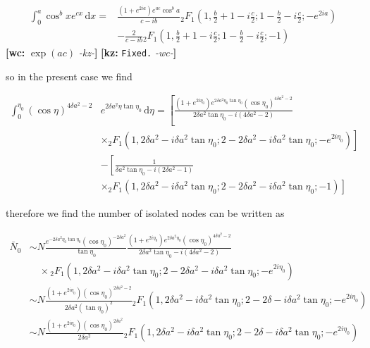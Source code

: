 \documentclass[preprint,notitlepage,amsmath,amssymb,floatfix]{revtex4-1}
\newcommand{\XXX}[3]{{\bf [#1: } {\tt #3} {\it -#2-}{\bf ]}}
\begin{document}
\begin{equation}
\begin{split}
\int_0^a\!\cos^bxe^{cx}\,\mathrm dx = &\frac{\left(1+e^{2ia}\right)e^{ac}\cos^ba}{c-ib} {}_2F_1\left(1,\frac{b}{2}+1-i\frac{c}{2};1-\frac{b}{2}-i\frac{c}{2};-e^{2ia}\right) \\
& - \frac{2}{c-ib} {}_2F_1\left(1,\frac{b}{2}+1-i\frac{c}{2};1-\frac{b}{2}-i\frac{c}{2};-1\right)
\end{split}
\end{equation}
\XXX{wc}{kz}{$\exp(ac)$} \XXX{kz}{wc}{Fixed.}

\noindent so in the present case we find

\begin{equation}
\begin{split}
\int_0^{\eta_0}\!\left(\cos\eta\right)^{4\delta a^2 - 2}&e^{2\delta a^2\eta\tan\eta_0}\,\mathrm d\eta = \left[\frac{\left(1+e^{2i\eta_0}\right)e^{2\delta a^2\eta_0\tan\eta_0}\left(\cos\eta_0\right)^{4\delta a^2 - 2}}{2\delta a^2\tan\eta_0 - i\left(4\delta a^2 - 2\right)}\right. \\
&\left.\times{}_2F_1\left(1,2\delta a^2 - i\delta a^2\tan\eta_0;2-2\delta a^2 - i\delta a^2\tan\eta_0;-e^{2i\eta_0}\right)\right] \\
& - \left[\frac{1}{\delta a^2\tan\eta_0 - i\left(2\delta a^2 - 1\right)}\right. \\
&\left.\times{}_2F_1\left(1,2\delta a^2-i\delta a^2\tan\eta_0;2-2\delta a^2-i\delta a^2\tan\eta_0;-1\right)\right]
\end{split}
\end{equation}

\noindent therefore we find the number of isolated nodes can be written as

\begin{equation}
\begin{split}
\bar{N}_0 &\sim N\frac{e^{-2\delta a^2\eta_0\tan\eta_0}\left(\cos\eta_0\right)^{-2\delta a^2}}{\tan\eta_0}\frac{\left(1+e^{2i\eta_0}\right)e^{2\delta a^2\eta_0}\left(\cos\eta_0\right)^{4\delta a^2-2}}{2\delta a^2\tan\eta_0 - i\left(4\delta a^2 - 2\right)} \\
& \quad\times {}_2F_1\left(1,2\delta a^2 - i\delta a^2\tan\eta_0;2-2\delta a^2 - i\delta a^2\tan\eta_0;-e^{2i\eta_0}\right) \\
&\sim N\frac{\left(1+e^{2i\eta_0}\right)\left(\cos\eta_0\right)^{2\delta a^2 - 2}}{2\delta a^2\left(\tan\eta_0\right)^2} {}_2F_1\left(1,2\delta a^2-i\delta a^2\tan\eta_0;2-2\delta-i\delta a^2\tan\eta_0;-e^{2i\eta_0}\right) \\
&\sim N\frac{\left(1+e^{2i\eta_0}\right)\left(\cos\eta_0\right)^{2\delta a^2}}{2\delta a^2} {}_2F_1\left(1,2\delta a^2-i\delta a^2\tan\eta_0;2-2\delta-i\delta a^2\tan\eta_0;-e^{2i\eta_0}\right)
\end{split}
\end{equation}
\end{document}
